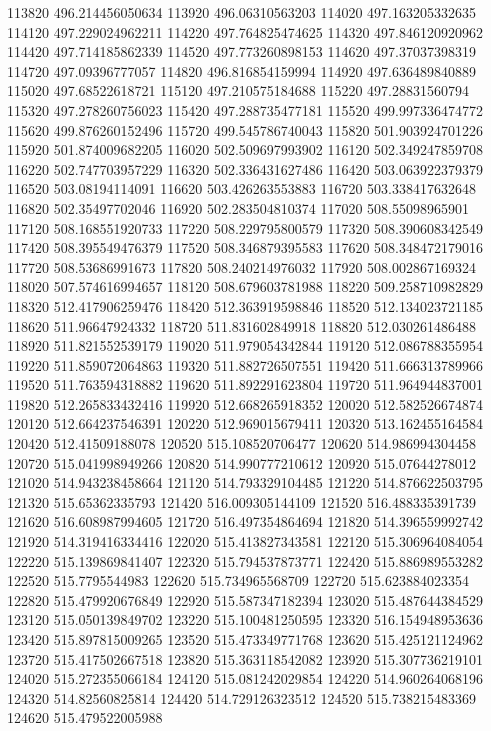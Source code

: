 {113820 496.214456050634
113920 496.06310563203
114020 497.163205332635
114120 497.229024962211
114220 497.764825474625
114320 497.846120920962
114420 497.714185862339
114520 497.773260898153
114620 497.37037398319
114720 497.09396777057
114820 496.816854159994
114920 497.636489840889
115020 497.68522618721
115120 497.210575184688
115220 497.28831560794
115320 497.278260756023
115420 497.288735477181
115520 499.997336474772
115620 499.876260152496
115720 499.545786740043
115820 501.903924701226
115920 501.874009682205
116020 502.509697993902
116120 502.349247859708
116220 502.747703957229
116320 502.336431627486
116420 503.063922379379
116520 503.08194114091
116620 503.426263553883
116720 503.338417632648
116820 502.35497702046
116920 502.283504810374
117020 508.55098965901
117120 508.168551920733
117220 508.229795800579
117320 508.390608342549
117420 508.395549476379
117520 508.346879395583
117620 508.348472179016
117720 508.53686991673
117820 508.240214976032
117920 508.002867169324
118020 507.574616994657
118120 508.679603781988
118220 509.258710982829
118320 512.417906259476
118420 512.363919598846
118520 512.134023721185
118620 511.96647924332
118720 511.831602849918
118820 512.030261486488
118920 511.821552539179
119020 511.979054342844
119120 512.086788355954
119220 511.859072064863
119320 511.882726507551
119420 511.666313789966
119520 511.763594318882
119620 511.892291623804
119720 511.964944837001
119820 512.265833432416
119920 512.668265918352
120020 512.582526674874
120120 512.664237546391
120220 512.969015679411
120320 513.162455164584
120420 512.41509188078
120520 515.108520706477
120620 514.986994304458
120720 515.041998949266
120820 514.990777210612
120920 515.07644278012
121020 514.943238458664
121120 514.793329104485
121220 514.876622503795
121320 515.65362335793
121420 516.009305144109
121520 516.488335391739
121620 516.608987994605
121720 516.497354864694
121820 514.396559992742
121920 514.319416334416
122020 515.413827343581
122120 515.306964084054
122220 515.139869841407
122320 515.794537873771
122420 515.886989553282
122520 515.7795544983
122620 515.734965568709
122720 515.623884023354
122820 515.479920676849
122920 515.587347182394
123020 515.487644384529
123120 515.050139849702
123220 515.100481250595
123320 516.154948953636
123420 515.897815009265
123520 515.473349771768
123620 515.425121124962
123720 515.417502667518
123820 515.363118542082
123920 515.307736219101
124020 515.272355066184
124120 515.081242029854
124220 514.960264068196
124320 514.82560825814
124420 514.729126323512
124520 515.738215483369
124620 515.479522005988
}
